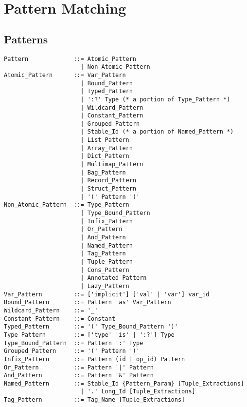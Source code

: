 
\chapter{Pattern Matching}
\label{sec:pattern-matching}

\minitoc

\newpage




\section{Patterns}
\label{sec:patterns}

\grammar\begin{lstlisting}
Pattern             ::= Atomic_Pattern
                      | Non_Atomic_Pattern
Atomic_Pattern      ::= Var_Pattern
                      | Bound_Pattern
                      | Typed_Pattern
                      | ':?' Type (* a portion of Type_Pattern *)
                      | Wildcard_Pattern
                      | Constant_Pattern
                      | Grouped_Pattern
                      | Stable_Id (* a portion of Named_Pattern *)
                      | List_Pattern
                      | Array_Pattern
                      | Dict_Pattern
                      | Multimap_Pattern
                      | Bag_Pattern
                      | Record_Pattern
                      | Struct_Pattern
                      | '(' Pattern ')'
Non_Atomic_Pattern  ::= Type_Pattern
                      | Type_Bound_Pattern
                      | Infix_Pattern
                      | Or_Pattern
                      | And_Pattern
                      | Named_Pattern
                      | Tag_Pattern
                      | Tuple_Pattern
                      | Cons_Pattern
                      | Annotated_Pattern
                      | Lazy_Pattern
Var_Pattern         ::= ['implicit'] ['val' | 'var'] var_id
Bound_Pattern       ::= Pattern 'as' Var_Pattern
Wildcard_Pattern    ::= '_'
Constant_Pattern    ::= Constant
Typed_Pattern       ::= '(' Type_Bound_Pattern ')'
Type_Pattern        ::= ['type' 'is' | ':?'] Type
Type_Bound_Pattern  ::= Pattern ':' Type
Grouped_Pattern     ::= '(' Pattern ')'
Infix_Pattern       ::= Pattern (id | op_id) Pattern
Or_Pattern          ::= Pattern '|' Pattern
And_Pattern         ::= Pattern '&' Pattern
Named_Pattern       ::= Stable_Id {Pattern_Param} [Tuple_Extractions]
                      | '.' Long_Id [Tuple_Extractions]
Tag_Pattern         ::= Tag_Name [Tuple_Extractions]

\end{lstlisting}
